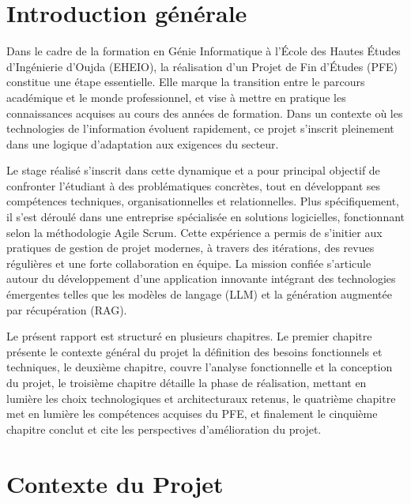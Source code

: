 \documentclass[12pt,a4paper]{report}
\begin{document}
	
	\tableofcontents

	
	\listoffigures

	
	\listoftables

	
	\clearpage
	
	
	\chapter*{Introduction générale}
	
	Dans le cadre de la formation en Génie Informatique à l’École des Hautes Études d’Ingénierie d’Oujda (EHEIO), la réalisation d’un Projet de Fin d’Études (PFE) constitue une étape essentielle. Elle marque la transition entre le parcours académique et le monde professionnel, et vise à mettre en pratique les connaissances acquises au cours des années de formation. Dans un contexte où les technologies de l’information évoluent rapidement, ce projet s’inscrit pleinement dans une logique d’adaptation aux exigences du secteur.
	
	Le stage réalisé s’inscrit dans cette dynamique et a pour principal objectif de confronter l’étudiant à des problématiques concrètes, tout en développant ses compétences techniques, organisationnelles et relationnelles. Plus spécifiquement, il s’est déroulé dans une entreprise spécialisée en solutions logicielles, fonctionnant selon la méthodologie Agile Scrum. Cette expérience a permis de s’initier aux pratiques de gestion de projet modernes, à travers des itérations, des revues régulières et une forte collaboration en équipe. La mission confiée s’articule autour du développement d’une application innovante intégrant des technologies émergentes telles que les modèles de langage (LLM) et la génération augmentée par récupération (RAG).
	
	Le présent rapport est structuré en plusieurs chapitres. Le premier chapitre présente le contexte général du projet la définition des besoins fonctionnels et techniques, le deuxième chapitre, couvre l'analyse fonctionnelle et la conception du projet, le troisième chapitre détaille la phase de réalisation, mettant en lumière les choix technologiques et architecturaux retenus, le quatrième chapitre met en lumière les compétences acquises du PFE, et finalement le cinquième chapitre conclut et cite les perspectives d'amélioration du projet.
	
	\chapter{Contexte du Projet}
	
\end{document}
